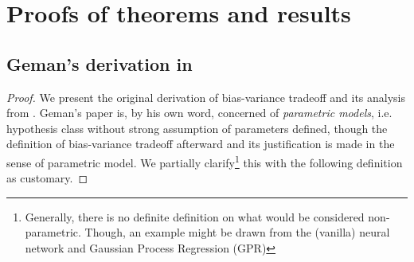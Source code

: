 \documentclass[twoside,10pt]{article}
\begin{document}
  

\clearpage

\appendix

\section{Proofs of theorems and results}

\subsection{Geman's derivation in \cite{6797087}}

\begin{proof}
    We present the original derivation of bias-variance tradeoff and its analysis from \cite{6797087}. Geman's paper is, by his own word, concerned of \textit{parametric models}, i.e. hypothesis class without strong assumption of parameters defined, though the definition of bias-variance tradeoff afterward and its justification is made in the sense of parametric model. We partially clarify\footnote{Generally, there is no definite definition on what would be considered non-parametric. Though, an example might be drawn from the (vanilla) neural network and Gaussian Process Regression (GPR)} this with the following definition as customary. 


\end{proof}
\end{document}
